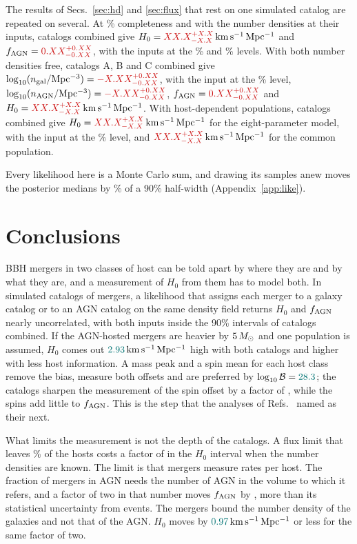 \documentclass[aps,prd,reprint,twocolumn,superscriptaddress,nofootinbib,floatfix]{revtex4-2}
\newcommand{\msun}{\,M_\odot}
\newcommand{\kms}{{\rm km\,s^{-1}\,Mpc^{-1}}}
\newcommand{\fagn}{f_{\rm AGN}}
\newcommand{\ngal}{n_{\rm gal}}
\newcommand{\nagn}{n_{\rm AGN}}
\newcommand{\lB}{\log_{10}\mathcal{B}}
\providecommand{\MCShiftMedian}{\ph{XX}}               %
\begin{document}
The results of Secs.~\ref{sec:hd} and \ref{sec:flux} that rest on one
simulated catalog are repeated on several. At \MockCompEighteen\%
completeness and with the number densities at their inputs, \FluxNcat{}
catalogs combined give $H_0=\FluxHzeroCombEighteen\,\kms$ and
$\fagn=\FluxfCombEighteen$, with the inputs at the
\FluxHzeroCombEighteenLevel\% and \FluxfCombEighteenLevel\% levels. With
both number densities free, catalogs A, B and C combined give
$\log_{10}(\ngal/{\rm Mpc^{-3}})=\FreeLognGalEighteenComb$, with the input
at the \FreeLognGalEighteenCombLevel\% level,
$\log_{10}(\nagn/{\rm Mpc^{-3}})=\FreeLognAGNEighteenComb$,
$\fagn=\FreefAGNEighteenComb$ and $H_0=\FreeHzeroEighteenComb\,\kms$. With
host-dependent populations, \HDNcat{} catalogs combined give
$H_0=\HDEightHzeroComb\,\kms$ for the eight-parameter model, with the input
at the \HDEightHzeroCombLevel\% level, and $\CommonHzeroComb\,\kms$ for the
common population.

Every likelihood here is a Monte Carlo sum, and drawing its samples anew
moves the posterior medians by \MCShiftMedian\% of a 90\% half-width
(Appendix~\ref{app:like}).

\section{Conclusions}
\label{sec:conclusions}

BBH mergers in two classes of host can be told apart by where they are and
by what they are, and a measurement of $H_0$ from them has to model both. In
simulated catalogs of \MockNev{} mergers, a likelihood that assigns each
merger to a galaxy catalog or to an AGN catalog on the same density field
returns $H_0$ and $\fagn$ nearly uncorrelated, with both inputs inside the
90\% intervals of \JointNcat{} catalogs combined. If the AGN-hosted
mergers are heavier by $\MockDmuG\msun$ and one population is assumed, $H_0$
comes out $\ShiftCommonMinusFix\,\kms$ high with both catalogs and higher
with less host information. A mass peak and a spin mean for each host class
remove the bias, measure both offsets and are preferred by
$\lB=\LBOffsetsVsCommon$; the catalogs sharpen the measurement of the spin
offset by a factor of \SpinDmuChiWidthRatio, while the spins add little to
$\fagn$. This is the step that the analyses of Refs.~\cite{Bom:2023zgw,
Cross-Parkin:2026pua,Pouw:2026lar} named as their next.

What limits the measurement is not the depth of the catalogs. A flux limit
that leaves \MockCompEighteen\% of the hosts costs a factor of
\FluxHzeroRatioEighteen{} in the $H_0$ interval when the number densities
are known. The limit is that mergers measure rates per host. The fraction of
mergers in AGN needs the number of AGN in the volume to which it refers, and
a factor of two in that number moves $\fagn$ by \DeltafTwoTwentyOne, more
than its statistical uncertainty from \MockNev{} events. The mergers bound
the number density of the galaxies and not that of the AGN. $H_0$ moves by
$\DeltaHzeroTwoEighteen\,\kms$ or less for the same factor of two.
\end{document}

